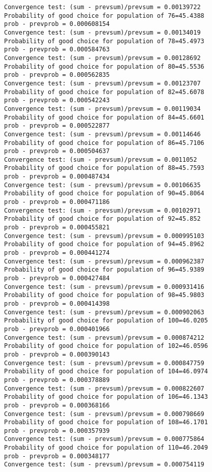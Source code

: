 \documentclass[11pt,onecolumn]{article}
\begin{document}
\begin{verbatim}
Convergence test: (sum - prevsum)/prevsum = 0.00139722
Probability of good choice for population of 76=45.4388
prob - prevprob = 0.000608154
Convergence test: (sum - prevsum)/prevsum = 0.00134019
Probability of good choice for population of 78=45.4973
prob - prevprob = 0.000584763
Convergence test: (sum - prevsum)/prevsum = 0.00128692
Probability of good choice for population of 80=45.5536
prob - prevprob = 0.000562835
Convergence test: (sum - prevsum)/prevsum = 0.00123707
Probability of good choice for population of 82=45.6078
prob - prevprob = 0.000542243
Convergence test: (sum - prevsum)/prevsum = 0.00119034
Probability of good choice for population of 84=45.6601
prob - prevprob = 0.000522877
Convergence test: (sum - prevsum)/prevsum = 0.00114646
Probability of good choice for population of 86=45.7106
prob - prevprob = 0.000504637
Convergence test: (sum - prevsum)/prevsum = 0.0011052
Probability of good choice for population of 88=45.7593
prob - prevprob = 0.000487434
Convergence test: (sum - prevsum)/prevsum = 0.00106635
Probability of good choice for population of 90=45.8064
prob - prevprob = 0.000471186
Convergence test: (sum - prevsum)/prevsum = 0.00102971
Probability of good choice for population of 92=45.852
prob - prevprob = 0.000455821
Convergence test: (sum - prevsum)/prevsum = 0.000995103
Probability of good choice for population of 94=45.8962
prob - prevprob = 0.000441274
Convergence test: (sum - prevsum)/prevsum = 0.000962387
Probability of good choice for population of 96=45.9389
prob - prevprob = 0.000427484
Convergence test: (sum - prevsum)/prevsum = 0.000931416
Probability of good choice for population of 98=45.9803
prob - prevprob = 0.000414398
Convergence test: (sum - prevsum)/prevsum = 0.000902063
Probability of good choice for population of 100=46.0205
prob - prevprob = 0.000401966
Convergence test: (sum - prevsum)/prevsum = 0.000874212
Probability of good choice for population of 102=46.0596
prob - prevprob = 0.000390143
Convergence test: (sum - prevsum)/prevsum = 0.000847759
Probability of good choice for population of 104=46.0974
prob - prevprob = 0.000378889
Convergence test: (sum - prevsum)/prevsum = 0.000822607
Probability of good choice for population of 106=46.1343
prob - prevprob = 0.000368166
Convergence test: (sum - prevsum)/prevsum = 0.000798669
Probability of good choice for population of 108=46.1701
prob - prevprob = 0.000357939
Convergence test: (sum - prevsum)/prevsum = 0.000775864
Probability of good choice for population of 110=46.2049
prob - prevprob = 0.000348177
Convergence test: (sum - prevsum)/prevsum = 0.000754119

\end{verbatim}
\end{document}
